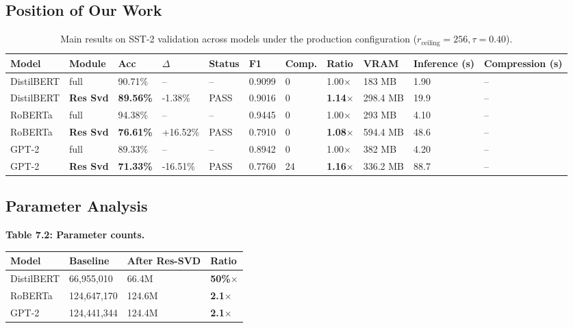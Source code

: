 \subsection{Position of Our Work}

\begin{table}[t]
\centering
\small
\begin{tabular}{lllllllllll}
\toprule
\textbf{Model} & \textbf{Module} & \textbf{Acc} & \textbf{$\Delta$} & \textbf{Status} & \textbf{F1} & \textbf{Comp.} & \textbf{Ratio} & \textbf{VRAM} & \textbf{Inference (s)} & \textbf{Compression (s)} \\
\midrule
DistilBERT & full & 90.71\% & -- & -- & 0.9099 & 0 & 1.00$\times$ & 183 MB & 1.90 & -- \\
DistilBERT & \textbf{Res Svd} & \textbf{89.56\%} & -1.38\% & PASS & 0.9016 & 0 & \textbf{1.14$\times$} & 298.4 MB & 19.9 & -- \\
RoBERTa & full & 94.38\% & -- & -- & 0.9445 & 0 & 1.00$\times$ & 293 MB & 4.10 & -- \\
RoBERTa & \textbf{Res Svd} & \textbf{76.61\%} & +16.52\% & PASS & 0.7910 & 0 & \textbf{1.08$\times$} & 594.4 MB & 48.6 & -- \\
GPT-2 & full & 89.33\% & -- & -- & 0.8942 & 0 & 1.00$\times$ & 382 MB & 4.20 & -- \\
GPT-2 & \textbf{Res Svd} & \textbf{71.33\%} & -16.51\% & PASS & 0.7760 & 24 & \textbf{1.16$\times$} & 336.2 MB & 88.7 & -- \\
\bottomrule
\end{tabular}
\caption{Main results on SST-2 validation across models under the production configuration ($r_{\mathrm{ceiling}}=256, \tau=0.40$).}
\label{tab:main_sst2}
\end{table}

\subsection{Parameter Analysis}

\textbf{Table 7.2: Parameter counts.}

\begin{table}[H]
\centering
\small
\begin{tabular}{llll}
\toprule
\textbf{Model} & \textbf{Baseline} & \textbf{After Res-SVD} & \textbf{Ratio} \\
\midrule
DistilBERT & 66,955,010 & 66.4M & \textbf{50\%$\times$} \\
RoBERTa & 124,647,170 & 124.6M & \textbf{2.1$\times$} \\
GPT-2 & 124,441,344 & 124.4M & \textbf{2.1$\times$} \\
\bottomrule
\end{tabular}
\end{table}

